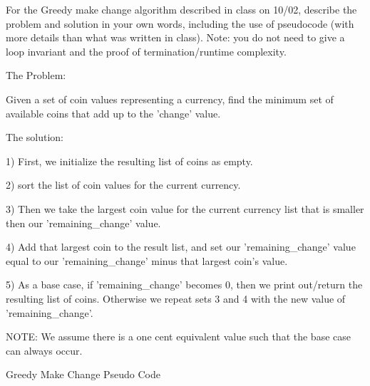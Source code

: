 \documentclass{article}
\begin{document}
\nextprob
For the Greedy make change algorithm described in class on 10/02, describe the
problem and solution in your own words, including the use of pseudocode (with
more details than what was written in class).  Note: you do not need to give a
loop invariant and the proof of termination/runtime complexity.

The Problem:

Given a set of coin values representing a currency, find the minimum set of available coins that add up to the 'change' value.

The solution:

1) First, we initialize the resulting list of coins as empty.

2) sort the list of coin values for the current currency.

3) Then we take the largest coin value for the current currency list that is smaller then our 'remaining\_change' value.

4) Add that largest coin to the result list, and set our 'remaining\_change' value equal to our 'remaining\_change' minus that largest coin's value.

5) As a base case, if 'remaining\_change' becomes 0, then we print out/return the resulting list of coins. Otherwise we repeat sets 3 and 4 with the new value of 'remaining\_change'. 

NOTE: We assume there is a one cent equivalent value such that the base case can always occur.

\begin{algorithm}
    \caption{Greedy Make Change Pseudo Code}
    \begin{algorithmic}
            \State $result\_list$ = []
                \State return $result\_list$
            \EndIf
            
        \State sort(currency\_list, LARGE\_TO\_SMALL) 
        
                \State $result\_list.append(currency\_list[i])$  $remaining\_change$}
                \State $remaining\_change$ $-=$ currency\_list[i].value()
                \State Break
            \EndIf
        \EndFor
        
        \State $result\_list$.concatenate($Greedy\_Make\_Change(currency\_list$, $remaining\_changes)$)
        
        \State \textbf{return} result\_list
        \EndProcedure
    \end{algorithmic}
\end{algorithm}
\end{document}
